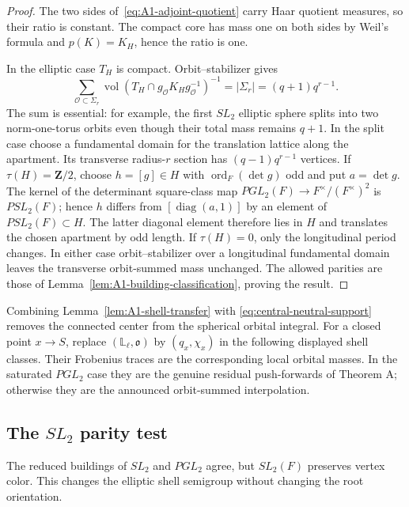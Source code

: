 \documentclass[11pt]{article}
\theoremstyle{definition}
\theoremstyle{remark}
\newcommand{\Lell}{\mathbb L_{\ell}}
\newcommand{\ord}{\operatorname{ord}}
\newcommand{\vol}{\operatorname{vol}}
\begin{document}
\begin{proof}
The two sides of~\eqref{eq:A1-adjoint-quotient} carry Haar quotient measures,
so their ratio is constant.  The compact core has mass one on both sides by
Weil's formula and $p(K)=K_H$, hence the ratio is one.

In the elliptic case $T_H$ is compact.  Orbit--stabilizer gives
\[
 \sum_{\mathcal O\subset\Sigma_r}
 \vol(T_H\cap g_{\mathcal O}K_Hg_{\mathcal O}^{-1})^{-1}
 =|\Sigma_r|=(q+1)q^{r-1}.
\]
The sum is essential: for example, the first $SL_2$ elliptic sphere splits
into two norm-one-torus orbits even though their total mass remains $q+1$.
In the split case choose a fundamental domain for the translation lattice
along the apartment.  Its transverse radius-$r$ section has
$(q-1)q^{r-1}$ vertices.  If $\tau(H)=\mathbf Z/2$, choose
$h=[g]\in H$ with $\ord_F(\det g)$ odd and put $a=\det g$.  The kernel of
the determinant square-class map
$PGL_2(F)\to F^\times/(F^\times)^2$ is $PSL_2(F)$; hence $h$ differs from
$[\operatorname{diag}(a,1)]$ by an element of $PSL_2(F)\subset H$.  The
latter diagonal element therefore lies in $H$ and translates the chosen
apartment by odd length.  If $\tau(H)=0$, only the longitudinal period
changes.  In either case orbit--stabilizer over a longitudinal fundamental
domain leaves the transverse orbit-summed mass unchanged.
The allowed parities are those of
Lemma~\ref{lem:A1-building-classification}, proving the result.
\end{proof}

Combining Lemma~\ref{lem:A1-shell-transfer} with
\eqref{eq:central-neutral-support} removes the connected center from the
spherical orbital integral.  For a closed point $x\to S$, replace
$(\Lell,\mathfrak o)$ by $(q_x,\chi_x)$ in the following displayed shell
classes.  Their Frobenius traces are the corresponding local orbital masses.
In the saturated $PGL_2$ case they are the genuine residual push-forwards of
Theorem A; otherwise they are the announced orbit-summed interpolation.

\subsection{The \texorpdfstring{$SL_2$}{SL2} parity test}

The reduced buildings of $SL_2$ and $PGL_2$ agree, but $SL_2(F)$ preserves
vertex color.  This changes the elliptic shell semigroup without changing
the root orientation.
\end{document}

